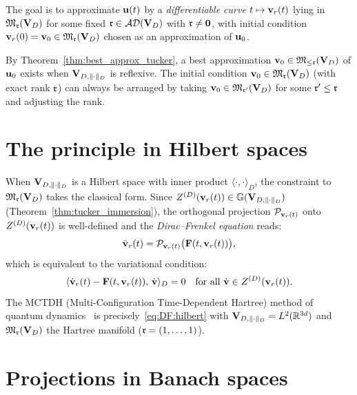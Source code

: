 The goal is to approximate $\mathbf{u}(t)$ by a \emph{differentiable curve}
$t \mapsto \mathbf{v}_r(t)$ lying in $\mathfrak{M}_{\mathfrak{r}}(\mathbf{V}_D)$ for some fixed
$\mathfrak{r} \in \mathcal{AD}(\mathbf{V}_D)$ with $\mathfrak{r} \neq \mathbf{0}$, with initial condition
$\mathbf{v}_r(0) = \mathbf{v}_0 \in \mathfrak{M}_{\mathfrak{r}}(\mathbf{V}_D)$ chosen as an approximation
of $\mathbf{u}_0$.

\begin{remark}
\label{rem:DF:initial}
By Theorem~\ref{thm:best_approx_tucker}, a best approximation
$\mathbf{v}_0 \in \mathfrak{M}_{\leq\mathfrak{r}}(\mathbf{V}_D)$ of $\mathbf{u}_0$ exists when $\mathbf{V}_{D,\|\cdot\|_D}$
is reflexive. The initial condition $\mathbf{v}_0 \in \mathfrak{M}_{\mathfrak{r}}(\mathbf{V}_D)$
(with exact rank $\mathfrak{r}$) can always be arranged by taking
$\mathbf{v}_0 \in \mathfrak{M}_{\mathfrak{r}'}(\mathbf{V}_D)$ for some $\mathfrak{r}' \leq \mathfrak{r}$ and
adjusting the rank.
\end{remark}

\section{The principle in Hilbert spaces}
\label{sec:DF:hilbert}

When $\mathbf{V}_{D,\|\cdot\|_D}$ is a Hilbert space with inner product
$\langle \cdot, \cdot \rangle_D$, the constraint to $\mathfrak{M}_{\mathfrak{r}}(\mathbf{V}_D)$
takes the classical form. Since $Z^{(D)}(\mathbf{v}_r(t)) \in \mathbb{G}(\mathbf{V}_{D,\|\cdot\|_D})$
(Theorem~\ref{thm:tucker_immersion}), the orthogonal projection
$\mathcal{P}_{\mathbf{v}_r(t)}$ onto $Z^{(D)}(\mathbf{v}_r(t))$ is well-defined and the
\emph{Dirac--Frenkel equation} reads:
\begin{equation}
\label{eq:DF:hilbert}
    \dot{\mathbf{v}}_r(t) = \mathcal{P}_{\mathbf{v}_r(t)}\bigl(\mathbf{F}(t, \mathbf{v}_r(t))\bigr),
\end{equation}
which is equivalent to the variational condition:
\begin{equation}
\label{eq:DF:variational}
    \langle \dot{\mathbf{v}}_r(t) - \mathbf{F}(t, \mathbf{v}_r(t)),\, \dot{\mathbf{v}} \rangle_D = 0
    \quad \text{for all } \dot{\mathbf{v}} \in Z^{(D)}(\mathbf{v}_r(t)).
\end{equation}
The MCTDH (Multi-Configuration Time-Dependent Hartree) method of
quantum dynamics~\cite{Lubich2008} is precisely~\eqref{eq:DF:hilbert}
with $\mathbf{V}_{D,\|\cdot\|_D} = L^2(\mathbb{R}^{3d})$ and $\mathfrak{M}_{\mathfrak{r}}(\mathbf{V}_D)$ the Hartree
manifold ($\mathfrak{r} = (1,\ldots,1)$).

\section{Projections in Banach spaces}
\label{sec:DF:projection}

